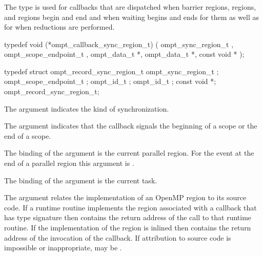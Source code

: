 \subsubsection{}
\label{sec:ompt_callback_sync_region_t}

\summary
The  type is used for callbacks that are 
dispatched when barrier regions,  regions, and 
regions begin and end and when waiting begins and ends for them as well as 
for when reductions are performed.

\format
\begin{ccppspecific}
\begin{omptCallback}
typedef void (*ompt_callback_sync_region_t) (
  ompt_sync_region_t ,
  ompt_scope_endpoint_t ,
  ompt_data_t *,
  ompt_data_t *,
  const void *
);
\end{omptCallback}
\end{ccppspecific}

\record
\begin{ccppspecific}
\begin{omptRecord}
typedef struct ompt_record_sync_region_t {
  ompt_sync_region_t ;
  ompt_scope_endpoint_t ;
  ompt_id_t ;
  ompt_id_t ;
  const void *;
} ompt_record_sync_region_t;
\end{omptRecord}
\end{ccppspecific}

\argdesc
The  argument indicates the kind of synchronization.

The  argument indicates that the callback signals
the beginning of a scope or the end of a scope.

The binding of the  argument is the current parallel region.
For the  event at the end of a parallel region this argument 
is .

The binding of the  argument is the current task.

The  argument relates the implementation of an OpenMP region
to its source code. If a runtime routine implements the region associated with
a callback that has type signature  then
 contains the return address of the call to that runtime routine.
If the implementation of the region is inlined then  contains the
return address of the invocation of the callback. If attribution to source code
is impossible or inappropriate,  may be .

